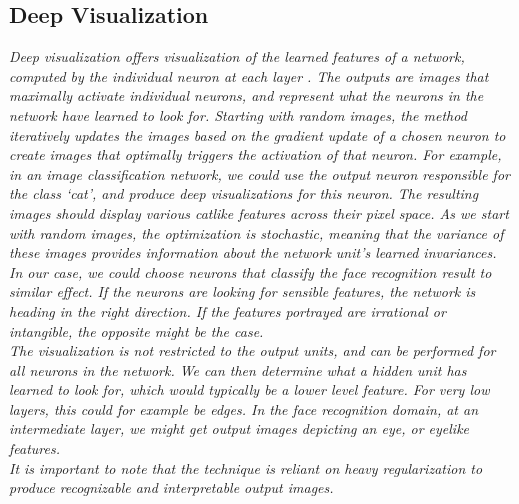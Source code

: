 \subsection{Deep Visualization}

\textit{Deep visualization offers visualization of the learned features of a network, computed by the individual neuron at each layer \cite{deepvis, deepvis_web}. The outputs are images that maximally activate individual neurons, and represent what the neurons in the network have learned to look for. Starting with random images, the method iteratively updates the images based on the gradient update of a chosen neuron to create images that optimally triggers the activation of that neuron. For example, in an image classification network, we could use the output neuron responsible for the class ‘cat’, and produce deep visualizations for this neuron. The resulting images should display various catlike features across their pixel space. As we start with random images, the optimization is stochastic, meaning that the variance of these images provides information about the network unit’s learned invariances. In our case, we could choose neurons that classify the face recognition result to similar effect. If the neurons are looking for sensible features, the network is heading in the right direction. If the features portrayed are irrational or intangible, the opposite might be the case.} \\ 

\noindent \textit{The visualization is not restricted to the output units, and can be performed for all neurons in the network. We can then determine what a hidden unit has learned to look for, which would typically be a lower level feature. For very low layers, this could for example be edges. In the face recognition domain, at an intermediate layer, we might get output images depicting an eye, or eyelike features.} \\

\noindent \textit{It is important to note that the technique is reliant on heavy regularization to produce recognizable and interpretable output images.}

\cleardoublepage